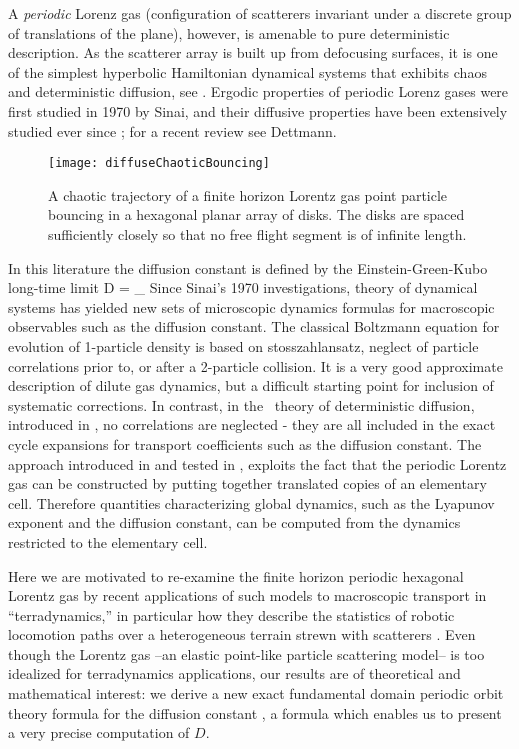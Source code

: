 A {\em periodic} Lorenz gas (configuration of scatterers invariant under a
discrete group of translations of the plane), however, is amenable to pure
deterministic description.
As the scatterer array is built up from defocusing surfaces, it is one of the
simplest hyperbolic Hamiltonian dynamical systems that exhibits chaos and
deterministic diffusion, see .
Ergodic properties of periodic Lorenz gases were first studied in 1970 by
Sinai, and their diffusive properties have been extensively studied
ever since%
;
for a recent review  see Dettmann.
%
\begin{figure}[htbp]
	\begin{center}
		\texttt{[image: diffuseChaoticBouncing]}
	\end{center}
	\caption[]{\label{fig-chaoticBouncing}
A chaotic trajectory of a finite horizon Lorentz gas point particle bouncing in a
hexagonal planar array of disks. The disks are spaced sufficiently closely so that
no free flight segment is of infinite length.
	}
\end{figure}
%
In this literature
the diffusion constant is defined by
the Einstein-Green-Kubo long-time limit
\beq
D = \lim_{\zeit \to \infty} 
Since Sinai's  1970 investigations, theory of dynamical systems has yielded new
sets of microscopic dynamics formulas for macroscopic observables such as the
diffusion constant.
The classical Boltzmann equation for evolution of 1-particle density
is based on stosszahlansatz, neglect of particle correlations prior
to, or after a 2-particle collision. It is a very good approximate
description of dilute gas dynamics, but a difficult starting point for
inclusion of systematic corrections. In contrast, in the \po\ theory of
deterministic diffusion, introduced in
, no correlations are neglected -
they are all included in the exact cycle expansions for transport
coefficients such as the diffusion constant.
The approach introduced in  and tested in
, exploits the fact that the periodic Lorentz gas can be
constructed by putting together translated copies of an elementary cell.
Therefore quantities characterizing global dynamics, such as the Lyapunov
exponent and the diffusion constant, can be computed from the dynamics
restricted to the elementary cell.

Here we are motivated to re-examine the finite horizon periodic hexagonal Lorentz
gas by recent applications of such models to macroscopic transport in
``terradynamics,'' in particular how they describe the statistics of robotic
locomotion paths over a heterogeneous terrain strewn with scatterers%
.
Even though the Lorentz gas --an elastic point-like particle scattering model--
is too idealized for terradynamics applications, our results are of theoretical
and mathematical interest: we derive a new exact fundamental domain periodic
orbit theory formula for the diffusion constant , a formula  which
enables us to present a very precise computation of $D$.

